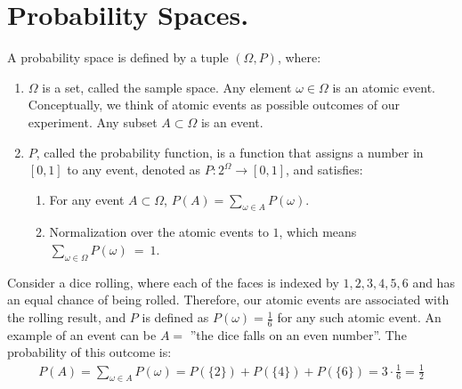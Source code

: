 \section{ Probability Spaces. }

\begin{definition}
  A probability space is defined by a tuple $(\Omega,P)$, where:
  \begin{enumerate} 
    \item $\Omega$ is a set, called the sample space. Any element $\omega\in \Omega$ is an atomic event. Conceptually, we think of atomic events as possible outcomes of our experiment. Any subset $A \subset \Omega$ is an event. 
    \item $P$, called the probability function, is a function that assigns a number in $[0,1]$ to any event, denoted as $P : 2^\Omega \rightarrow [0,1]$, and satisfies:
      \begin{enumerate}
        \item For any event $A \subset \Omega$, $P(A) = \sum_{\omega\in A}P(\omega)$. 
        \item Normalization over the atomic events to $1$, which means $\sum_{\omega\in\Omega}P(\omega)~=~1$.
      \end{enumerate}
  \end{enumerate}
\end{definition}
\begin{example}
  Consider a dice rolling, where each of the faces is indexed by $1,2,3,4,5,6$ and has an equal chance of being rolled. Therefore, our atomic events are associated with the rolling result, and $P$ is defined as $P(\omega) = \frac{1}{6}$ for any such atomic event.
  An example of an event can be $A=$ ''the dice falls on an even number''. The probability of this outcome is:
  \begin{equation*}
    \begin{split}
      P(A)= \sum_{\omega\in A}{ P(\omega) } = P(\{2\}) + P(\{4\}) + P(\{6\}) = 3\cdot \frac{1}{6} = \frac{1}{2} 
    \end{split}
  \end{equation*}
\end{example}

